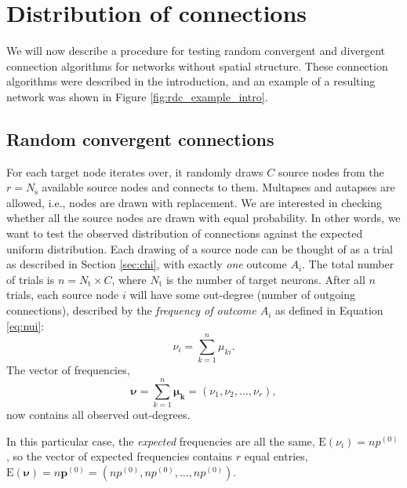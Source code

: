 \chapter{Distribution of connections\label{ch:nonspatial}}

\graphicspath{{figs/nonspatial/}}



We will now describe a procedure for testing random convergent and divergent connection algorithms for networks without spatial structure. These connection algorithms were described in the introduction, and an example of a resulting network was shown in Figure \ref{fig:rdc_example_intro}.



\section{Random convergent connections\label{sec:rcc}}

For each target node  iterates over, it randomly draws $C\label{eq:C}$ source nodes from the $r = N_\text{s}\label{eq:Ns}$ available source nodes and connects to them. Multapses and autapses are allowed, i.e., nodes are drawn with replacement. We are interested in checking whether all the source nodes are drawn with equal probability. In other words, we want to test the observed distribution of connections against the expected uniform distribution. Each drawing of a source node can be thought of as a trial as described in Section \ref{sec:chi}, with exactly \emph{one} outcome $A_i$. The total number of trials is $n = N_\text{t} \times C$, where $N_\text{t}\label{eq:Nt}$ is the number of target neurons. After all $n$ trials, each source node $i$ will have some out-degree (number of outgoing connections), described by the \emph{frequency of outcome $A_i$} as defined in Equation \ref{eq:nui}:
\begin{equation}
\nu_i = \sum_{k=1}^n{\mu_{ki}}.
\end{equation}
The vector of frequencies, 
\begin{equation}
\bm{\nu} = \sum_{k=1}^n{\bm{\mu_k}} = (\nu_1, \nu_2, ..., \nu_r),
\end{equation}
now contains all observed out-degrees. 

In this particular case, the \emph{expected} frequencies are all the same, $\text{E}(\nu_i) = np^{(0)}$, so the vector of expected frequencies contains $r$ equal entries, $\text{E}(\bm{\nu}) = n\bm{p}^{(0)} = (np^{(0)}, np^{(0)}, ..., np^{(0)})$.


